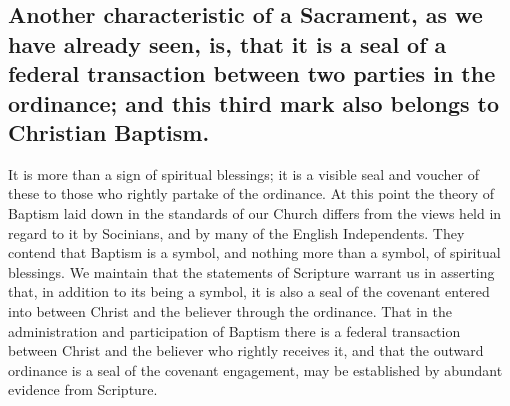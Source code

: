 \documentclass[english,]{book}
\begin{document}
\hypertarget{another-characteristic-of-a-sacrament-as-we-have-already-seen-is-that-it-is-a-seal-of-a-federal-transaction-between-two-parties-in-the-ordinance-and-this-third-mark-also-belongs-to-christian-baptism.}{%
\subsection{Another characteristic of a Sacrament, as we have already seen, is, that it is a seal of a federal transaction between two parties in the ordinance; and this third mark also belongs to Christian Baptism.}\label{another-characteristic-of-a-sacrament-as-we-have-already-seen-is-that-it-is-a-seal-of-a-federal-transaction-between-two-parties-in-the-ordinance-and-this-third-mark-also-belongs-to-christian-baptism.}}

It is more than a sign of spiritual blessings; it is a visible seal and voucher of these to those who rightly partake of the ordinance. At this point the theory of Baptism laid down in the standards of our Church differs from the views held in regard to it by Socinians, and by many of the English Independents. They contend that Baptism is a symbol, and nothing more than a symbol, of spiritual blessings. We maintain that the statements of Scripture warrant us in asserting that, in addition to its being a symbol, it is also a seal of the covenant entered into between Christ and the believer through the ordinance. That in the administration and participation of Baptism there is a federal transaction between Christ and the believer who rightly receives it, and that the outward ordinance is a seal of the covenant engagement, may be established by abundant evidence from Scripture.
\end{document}
